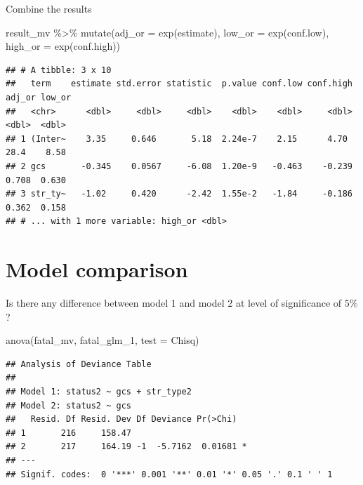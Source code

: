 \documentclass[
]{book}
\makeatletter
\newenvironment{Shaded}{\begin{snugshade}}{\end{snugshade}}
\newcommand{\AttributeTok}[1]{\textcolor[rgb]{0.61,0.61,0.61}{#1}}
\newcommand{\FunctionTok}[1]{\textcolor[rgb]{0,0,0}{#1}}
\newcommand{\NormalTok}[1]{#1}
\newcommand{\SpecialCharTok}[1]{\textcolor[rgb]{0,0,0}{#1}}
\newcommand{\StringTok}[1]{\textcolor[rgb]{0.5,0.5,0.5}{#1}}
\newenvironment{kframe}{%
\medskip{}
\setlength{\fboxsep}{.8em}
 \def\at@end@of@kframe{}%
 \ifinner\ifhmode%
  \def\at@end@of@kframe{\end{minipage}}%
  \begin{minipage}{\columnwidth}%
 \fi\fi%
 \def\FrameCommand##1{\hskip\@totalleftmargin \hskip-\fboxsep
 \colorbox{shadecolor}{##1}\hskip-\fboxsep
     \hskip-\linewidth \hskip-\@totalleftmargin \hskip\columnwidth}%
 \MakeFramed {\advance\hsize-\width
   \@totalleftmargin\z@ \linewidth\hsize
   \@setminipage}}%
 {\par\unskip\endMakeFramed%
 \at@end@of@kframe}
\renewenvironment{Shaded}{\begin{kframe}}{\end{kframe}}
\makeatother
\begin{document}
Combine the results

\begin{Shaded}
\begin{Highlighting}[]
\NormalTok{result\_mv }\SpecialCharTok{\%\textgreater{}\%} \FunctionTok{mutate}\NormalTok{(}\AttributeTok{adj\_or =} \FunctionTok{exp}\NormalTok{(estimate),}
                     \AttributeTok{low\_or =} \FunctionTok{exp}\NormalTok{(conf.low),}
                     \AttributeTok{high\_or =} \FunctionTok{exp}\NormalTok{(conf.high))}
\end{Highlighting}
\end{Shaded}

\begin{verbatim}
## # A tibble: 3 x 10
##   term    estimate std.error statistic  p.value conf.low conf.high adj_or low_or
##   <chr>      <dbl>     <dbl>     <dbl>    <dbl>    <dbl>     <dbl>  <dbl>  <dbl>
## 1 (Inter~    3.35     0.646       5.18  2.24e-7    2.15      4.70  28.4    8.58 
## 2 gcs       -0.345    0.0567     -6.08  1.20e-9   -0.463    -0.239  0.708  0.630
## 3 str_ty~   -1.02     0.420      -2.42  1.55e-2   -1.84     -0.186  0.362  0.158
## # ... with 1 more variable: high_or <dbl>
\end{verbatim}

\hypertarget{model-comparison}{%
\section{Model comparison}\label{model-comparison}}

Is there any difference between model 1 and model 2 at level of significance of \(5\%\)?

\begin{Shaded}
\begin{Highlighting}[]
\FunctionTok{anova}\NormalTok{(fatal\_mv, fatal\_glm\_1, }\AttributeTok{test =} \StringTok{\textquotesingle{}Chisq\textquotesingle{}}\NormalTok{)}
\end{Highlighting}
\end{Shaded}

\begin{verbatim}
## Analysis of Deviance Table
## 
## Model 1: status2 ~ gcs + str_type2
## Model 2: status2 ~ gcs
##   Resid. Df Resid. Dev Df Deviance Pr(>Chi)  
## 1       216     158.47                       
## 2       217     164.19 -1  -5.7162  0.01681 *
## ---
## Signif. codes:  0 '***' 0.001 '**' 0.01 '*' 0.05 '.' 0.1 ' ' 1
\end{verbatim}
\end{document}
